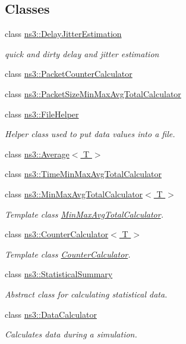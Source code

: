 \subsection*{Classes}
\begin{DoxyCompactItemize}
\item 
class \hyperlink{classns3_1_1DelayJitterEstimation}{ns3\+::\+Delay\+Jitter\+Estimation}
\begin{DoxyCompactList}\small\item\em quick and dirty delay and jitter estimation \end{DoxyCompactList}\item 
class \hyperlink{classns3_1_1PacketCounterCalculator}{ns3\+::\+Packet\+Counter\+Calculator}
\item 
class \hyperlink{classns3_1_1PacketSizeMinMaxAvgTotalCalculator}{ns3\+::\+Packet\+Size\+Min\+Max\+Avg\+Total\+Calculator}
\item 
class \hyperlink{classns3_1_1FileHelper}{ns3\+::\+File\+Helper}
\begin{DoxyCompactList}\small\item\em Helper class used to put data values into a file. \end{DoxyCompactList}\item 
class \hyperlink{classns3_1_1Average}{ns3\+::\+Average$<$ T $>$}
\item 
class \hyperlink{classns3_1_1TimeMinMaxAvgTotalCalculator}{ns3\+::\+Time\+Min\+Max\+Avg\+Total\+Calculator}
\item 
class \hyperlink{classns3_1_1MinMaxAvgTotalCalculator}{ns3\+::\+Min\+Max\+Avg\+Total\+Calculator$<$ T $>$}
\begin{DoxyCompactList}\small\item\em Template class \hyperlink{classns3_1_1MinMaxAvgTotalCalculator}{Min\+Max\+Avg\+Total\+Calculator}. \end{DoxyCompactList}\item 
class \hyperlink{classns3_1_1CounterCalculator}{ns3\+::\+Counter\+Calculator$<$ T $>$}
\begin{DoxyCompactList}\small\item\em Template class \hyperlink{classns3_1_1CounterCalculator}{Counter\+Calculator}. \end{DoxyCompactList}\item 
class \hyperlink{classns3_1_1StatisticalSummary}{ns3\+::\+Statistical\+Summary}
\begin{DoxyCompactList}\small\item\em Abstract class for calculating statistical data. \end{DoxyCompactList}\item 
class \hyperlink{classns3_1_1DataCalculator}{ns3\+::\+Data\+Calculator}
\begin{DoxyCompactList}\small\item\em Calculates data during a simulation. \end{DoxyCompactList}\end{DoxyCompactItemize}


